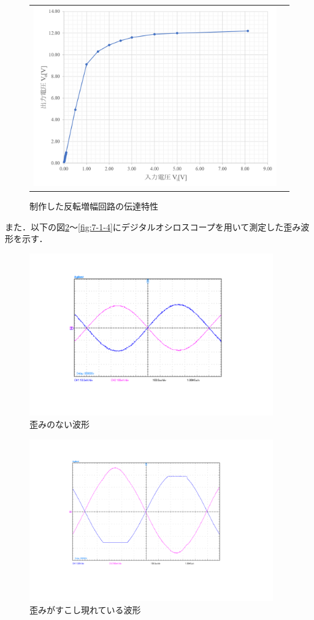 \documentclass[10pt, a4j, dvipdfmx]{jarticle}
\makeatletter
\newcommand{\figcaption}[1]{\def\@captype{figure}\caption{#1}}
\makeatother
\begin{document}
\begin{figure}[H]
\begin{tabular}{cc}
\begin{minipage}{0.66\hsize}
			\includegraphics[width = 0.9\hsize]{experiment/7-1-1.png}
			\figcaption{制作した反転増幅回路の伝達特性}
			\label{fig:7-1-1}
		\end{minipage}
	\end{tabular}
\end{figure}
    また．以下の図\ref{fig:7-1-2}～\ref{fig:7-1-4}にデジタルオシロスコープを用いて測定した歪み波形を示す．
\begin{figure}[H]
    \centering
    \includegraphics[height=70mm]{Result/Reverse/reverse-Hannten(input_10mV_output_95mV).png}
    \figcaption{歪みのない波形}
    \label{fig:7-1-2}
\end{figure}
\begin{figure}[H]
    \centering
    \includegraphics[height=70mm]{Result/Reverse/reverse-Hannten(input_1000mV_output_9120mV).png}
    \figcaption{歪みがすこし現れている波形}
    \label{fig:7-1-3}
\end{figure}
\end{document}
